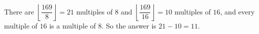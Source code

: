 There are $\left\lfloor\dfrac{169}{8}\right\rfloor=21$ multiples of $8$ and $\left\lfloor\dfrac{169}{16}\right\rfloor=10$ multiples of $16$, and every multiple of $16$ is a multiple of $8$. So the answer is $21-10=\boxed{11}$.
